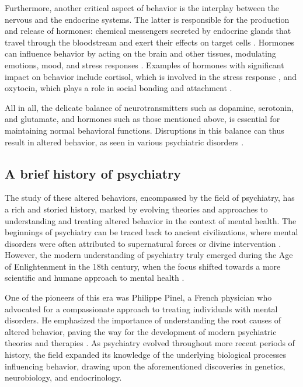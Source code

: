 Furthermore, another critical aspect of behavior is the interplay between the nervous and the endocrine systems. The latter is responsible for the production and release of hormones: chemical messengers secreted by endocrine glands that travel through the bloodstream and exert their effects on target cells \cite{Gardner2017GreenspansEdition}. Hormones can influence behavior by acting on the brain and other tissues, modulating emotions, mood, and stress responses \cite{McEwen2020HormonesScience}. Examples of hormones with significant impact on behavior include cortisol, which is involved in the stress response \cite{OConnor2020StressRisk}, and oxytocin, which plays a role in social bonding and attachment \cite{Bosch2018OxytocinDisruption}.

All in all, the delicate balance of neurotransmitters such as dopamine, serotonin, and glutamate, and hormones such as those mentioned above, is essential for maintaining normal behavioral functions. Disruptions in this balance can thus result in altered behavior, as seen in various psychiatric disorders \cite{AmericanPsychiatricAssociation2022DiagnosticDisorders}.

\subsection{A brief history of psychiatry}

The study of these altered behaviors, encompassed by the field of psychiatry, has a rich and storied history, marked by evolving theories and approaches to understanding and treating altered behavior in the context of mental health. The beginnings of psychiatry can be traced back to ancient civilizations, where mental disorders were often attributed to supernatural forces or divine intervention \cite{Fornaro2009MedicinePrejudices}. However, the modern understanding of psychiatry truly emerged during the Age of Enlightenment in the 18th century, when the focus shifted towards a more scientific and humane approach to mental health \cite{Kendler2022The1650-1850}.

One of the pioneers of this era was Philippe Pinel, a French physician who advocated for a compassionate approach to treating individuals with mental disorders. He emphasized the importance of understanding the root causes of altered behavior, paving the way for the development of modern psychiatric theories and therapies \cite{Wallace2008HistoryPsychology}. As psychiatry evolved throughout more recent periods of history, the field expanded its knowledge of the underlying biological processes influencing behavior, drawing upon the aforementioned discoveries in genetics, neurobiology, and endocrinology.

